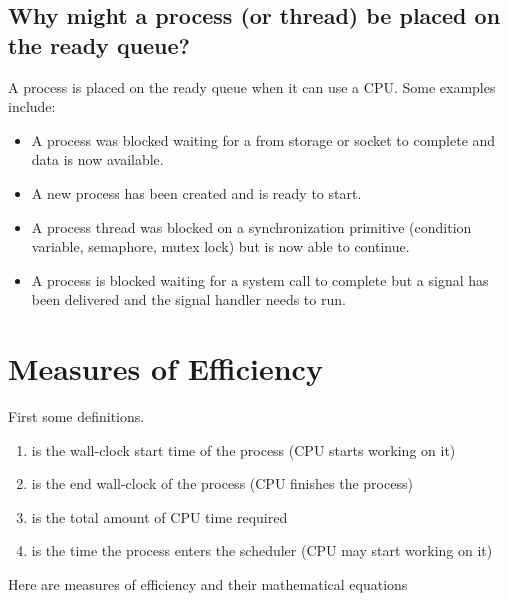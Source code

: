 \subsection{Why might a process (or thread) be placed on the ready queue?}

A process is placed on the ready queue when it can use a CPU. Some examples include:

\begin{itemize}
  \tightlist
\item A process was blocked waiting for a  from storage or socket to complete and data is now available.
\item A new process has been created and is ready to start.
\item A process thread was blocked on a synchronization primitive (condition variable, semaphore, mutex lock) but is now able to continue.
\item A process is blocked waiting for a system call to complete but a signal has been delivered and the signal handler needs to run.
\end{itemize}

\section{Measures of Efficiency}

First some definitions.

\begin{enumerate}
  \item {} is the wall-clock start time of the process (CPU starts working on it)
  \item {} is the end wall-clock of the process (CPU finishes the process)
  \item {} is the total amount of CPU time required
  \item {} is the time the process enters the scheduler (CPU may start working on it)
\end{enumerate}

Here are measures of efficiency and their mathematical equations

